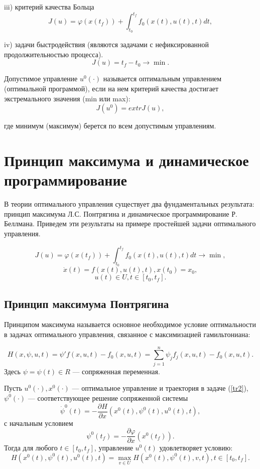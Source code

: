 iii) критерий качества Больца
$$J(u) = \varphi(x(t_{f})) +
\int^{t_{f}}_{ t_{0}}
f_0(x(t),u(t),t)dt,$$

iv) задачи быстродействия (являются задачами с нефиксированной продолжительностью процесса).
$$J(u) = t_{f} - t_{0} \rightarrow \min.$$
\begin{definition} Допустимое управление $u^{0}(\cdot)$ называется оптимальным управлением (оптимальной программой), если на нем критерий качества достигает экстремального значения (min или max):
$$J(u^0) = extr J(u),$$

где минимум (максимум) берется по всем допустимым управлениям.
\end{definition}
\section{Принцип максимума и динамическое программирование}\label{1sec:pm} %
В теории оптимального управления существует два фундаментальных результата: принцип максимума Л.С. Понтрягина\cite{Pontryagin} и динамическое программирование Р. Беллмана.\cite{Bellman} Приведем эти результаты на примере простейшей задачи оптимального управления.

 $$J(u) = \varphi(x(t_{f})) +
\int^{t_{f}}_{ t_{0}}
f_0(x(t),u(t),t)dt \rightarrow \min, $$
 \begin{equation}\label{tr2}\dot{x}(t)=f(x(t),u(t),t), x(t_0)=x_0,\end{equation}
$$u(t) \in U, t\in [t_0,t_f].$$

\subsection{Принцип максимума Понтрягина}

Принципом максимума называется основное необходимое условие оптимальности в задачах оптимального управления, связанное с максимизацией гамильтониана:

$$H(x,\psi, u, t) = \psi 'f(x, u, t) - f_0(x, u, t) = \sum^n_{j=1} \psi_j f_j(x, u, t) - f_0(x, u, t).$$ Здесь $\psi = \psi (t) \in R $ --- сопряженная переменная.
\begin{theorem}Пусть $u^0(\cdot), x^0(\cdot)$ — оптимальное управление и траектория в задаче (\ref{tr2}), $\psi^0(\cdot)$ — соответствующее решение сопряженной системы
$$ \dot{\psi}^0(t)= -\frac{\partial H}{\partial x}(x^0(t),\psi^0(t),u^0(t),t),$$ с начальным условием
$$\psi^0(t_f) = - \frac{\partial\varphi}{\partial x}(x^0(t_f)). $$
Тогда для любого $t \in [t_0,t_f]$, управление $u^0(t)$ удовлетворяет условию:
$$H(x^0(t),\psi^0(t),u^0(t),t) = \max_{v\in U}
H(x^0(t),\psi^0(t),v,t), t \in [t_0,t_f].$$
\end{theorem}

